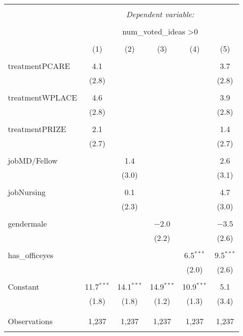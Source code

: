 \begin{table}
\centering

\begin{tabular}{@{\extracolsep{5pt}}lccccc} 
\\[-1.8ex]\hline 
\hline \\[-1.8ex] 
 & \multicolumn{5}{c}{\textit{Dependent variable:}} \\ 
\cline{2-6} 
\\[-1.8ex] & \multicolumn{5}{c}{num\_voted\_ideas \textgreater  0} \\ 
\\[-1.8ex] & (1) & (2) & (3) & (4) & (5)\\ 
\hline \\[-1.8ex] 
 treatmentPCARE & 4.1 &  &  &  & 3.7 \\ 
  & (2.8) &  &  &  & (2.8) \\ 
  & & & & & \\ 
 treatmentWPLACE & 4.6 &  &  &  & 3.9 \\ 
  & (2.8) &  &  &  & (2.8) \\ 
  & & & & & \\ 
 treatmentPRIZE & 2.1 &  &  &  & 1.4 \\ 
  & (2.7) &  &  &  & (2.7) \\ 
  & & & & & \\ 
 jobMD/Fellow &  & 1.4 &  &  & 2.6 \\ 
  &  & (3.0) &  &  & (3.1) \\ 
  & & & & & \\ 
 jobNursing &  & 0.1 &  &  & 4.7 \\ 
  &  & (2.3) &  &  & (3.0) \\ 
  & & & & & \\ 
 gendermale &  &  & $-$2.0 &  & $-$3.5 \\ 
  &  &  & (2.2) &  & (2.6) \\ 
  & & & & & \\ 
 has\_officeyes &  &  &  & 6.5$^{***}$ & 9.5$^{***}$ \\ 
  &  &  &  & (2.0) & (2.6) \\ 
  & & & & & \\ 
 Constant & 11.7$^{***}$ & 14.1$^{***}$ & 14.9$^{***}$ & 10.9$^{***}$ & 5.1 \\ 
  & (1.8) & (1.8) & (1.2) & (1.3) & (3.4) \\ 
  & & & & & \\ 
\hline \\[-1.8ex] 
Observations & 1,237 & 1,237 & 1,237 & 1,237 & 1,237 \\ 
\hline 
\hline \\[-1.8ex] 
\end{tabular} 
\end{table}
